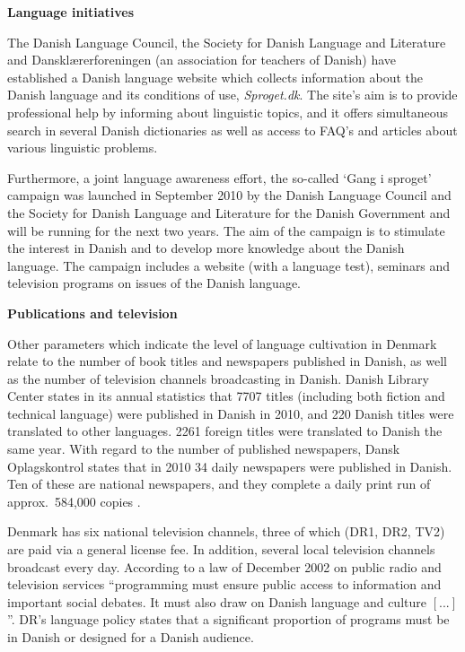 \documentclass[]{../../metanetpaper}
\begin{document}
\begin{multicols}{2}
{\bf Language initiatives}

The Danish Language Council, the Society for Danish Language and Literature and Dansk\-l\ae rerforeningen (an association for teachers of Danish) have established a Danish language website which collects information about the Danish language and its conditions of use, {\it Sproget.dk}. The site's aim is to provide professional help by informing about linguistic topics, and it offers simultaneous search in several Danish dictionaries as well as access to FAQ's and articles about various linguistic problems. 

Furthermore, a joint language awareness effort, the so-called `Gang i sproget' campaign was launched in September 2010 by the Danish Language Council and the Society for Danish Language and Literature for the Danish Government and will be running for the next two years. The aim of the campaign is to stimulate the interest in Danish and to develop more knowledge about the Danish language. The campaign includes a website (with a language test), seminars and television programs on issues of the Danish language. 

{\bf Publications and television}

Other parameters which indicate the level of language cultivation in Denmark relate to the number of book titles and newspapers published in Danish, as well as the number of television channels broadcasting in Danish. Danish Library Center states in its annual statistics that 7707 titles (including both fiction and technical language) were published in Danish in 2010, and 220 Danish titles were translated to other languages. 2261 foreign titles were translated to Danish the same year. With regard to the number of published newspapers, Dansk Oplagskontrol states that in 2010 34 daily newspapers were published in Danish. Ten of these are national newspapers, and they complete a daily print run of approx.\ 584,000 copies \cite{ddo}. 

Denmark has six national television channels, three of which (DR1, DR2, TV2) are paid via a general license fee. In addition, several local television channels broadcast every day. According to a law of December 2002 on public radio and television services ``programming must ensure public access to information and important social debates. It must also draw on Danish language and culture $[...]$''. DR's language policy states that a significant proportion of programs must be in Danish or designed for a Danish audience. 



\end{multicols}
\end{document}
